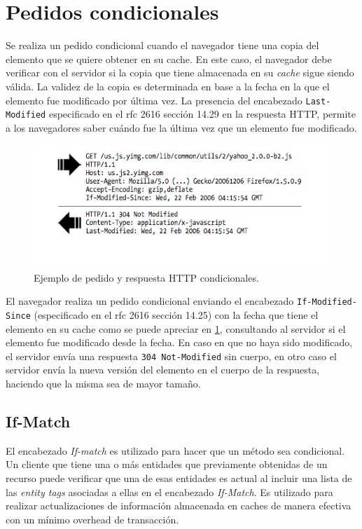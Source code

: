 \documentclass[a4paper,12pt]{report}
\begin{document}
\section{Pedidos condicionales}

Se realiza un pedido condicional cuando el navegador tiene una copia del elemento que se quiere obtener en su cache. En este caso, el navegador debe verificar con el servidor
si la copia que tiene almacenada en su \emph{cache} sigue siendo válida.
La validez de la copia es determinada en base a la fecha en la que el elemento fue modificado por última vez. La presencia del encabezado \texttt{Last-Modified}
especificado en el rfc 2616 \cite{rfc2616} sección 14.29 en la respuesta HTTP, permite a los navegadores saber cuándo fue la última vez que un elemento fue modificado.

\begin{figure}[h]
\centering
\includegraphics[width=1\textwidth]{figuras/apendice/condicional.jpg}
	\caption{Ejemplo de pedido y respuesta HTTP condicionales.}
    \label{fig.condicional}
\end{figure}

El navegador realiza un pedido condicional enviando el encabezado \texttt{If-Modified-Since} (especificado en el rfc 2616 \cite{rfc2616} sección 14.25) con la fecha que tiene el elemento
en su cache como se puede apreciar en \ref{fig.condicional}, consultando al servidor si el elemento fue modificado desde la fecha.
En caso en que no haya sido modificado, el servidor envía una respuesta \texttt{304 Not-Modified} sin cuerpo, en otro caso el servidor envía la nueva versión del elemento
en el cuerpo de la respuesta, haciendo que la misma sea de mayor tamaño.

\subsection{If-Match}
El encabezado \emph{If-match} es utilizado para hacer que un método sea condicional. Un cliente que tiene una o más entidades que previamente obtenidas de un recurso puede
verificar que una de esas entidades es actual al incluir una lista de las \emph{entity tags} asociadas a ellas en el encabezado \emph{If-Match}. Es utilizado para realizar
actualizaciones de información almacenada en caches de manera efectiva con un mínimo overhead de transacción.
\end{document}
